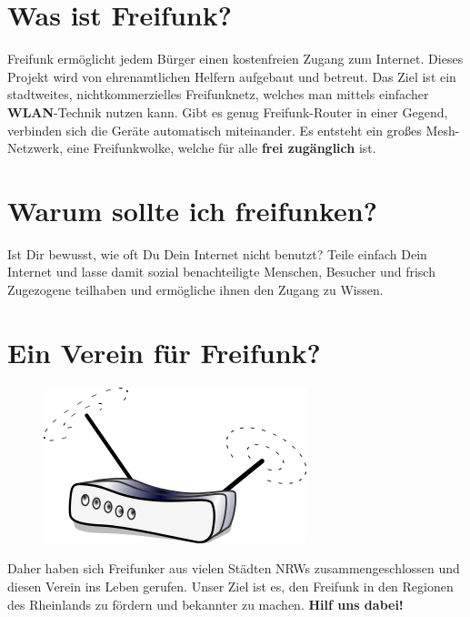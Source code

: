 \documentclass[10pt]{scrartcl}
\begin{document}
\section{\normalsize Was ist Freifunk?}
Freifunk ermöglicht jedem Bürger einen kostenfreien Zugang zum Internet. Dieses Projekt wird von ehrenamtlichen Helfern aufgebaut und betreut. Das Ziel ist ein stadtweites, nichtkommerzielles Freifunknetz, welches man mittels einfacher \textbf{WLAN}-Technik nutzen kann. Gibt es genug Freifunk-Router in einer Gegend, verbinden sich die Geräte automatisch miteinander. Es entsteht ein großes Mesh-Netzwerk, eine \glqq Freifunkwolke\grqq, welche für alle \textbf{frei zugänglich} ist.

\section{\normalsize Warum sollte ich freifunken?}
Ist Dir bewusst, wie oft Du Dein Internet nicht benutzt? Teile einfach Dein Internet und lasse damit sozial benachteiligte Menschen, Besucher und frisch Zugezogene teilhaben und ermögliche ihnen den Zugang zu Wissen.

\section{\normalsize Ein Verein für Freifunk?}
\begin{figure}
\includegraphics[scale=0.5]{Router}
\end{figure}
Daher haben sich Freifunker aus vielen Städten NRWs zusammengeschlossen und diesen Verein ins Leben gerufen.
Unser Ziel ist es, den Freifunk in den Regionen des Rheinlands zu fördern und bekannter zu machen.
\textbf{Hilf uns dabei!}

\newpage
{}
\end{document}
